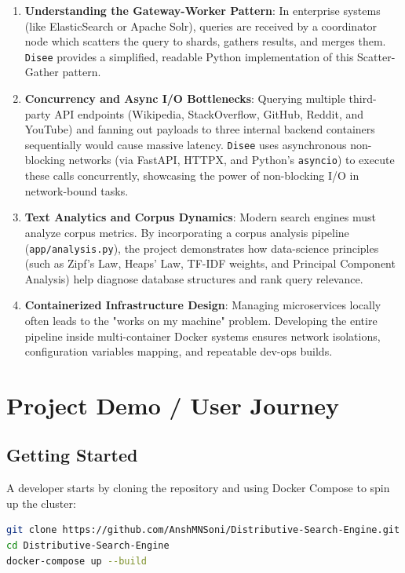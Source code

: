 \documentclass[11pt,a4paper]{article}
\begin{document}
\begin{enumerate}
    \item \textbf{Understanding the Gateway-Worker Pattern}:
    In enterprise systems (like ElasticSearch or Apache Solr), queries are received by a coordinator node which scatters the query to shards, gathers results, and merges them. \texttt{Disee} provides a simplified, readable Python implementation of this Scatter-Gather pattern.
    
    \item \textbf{Concurrency and Async I/O Bottlenecks}:
    Querying multiple third-party API endpoints (Wikipedia, StackOverflow, GitHub, Reddit, and YouTube) and fanning out payloads to three internal backend containers sequentially would cause massive latency. \texttt{Disee} uses asynchronous non-blocking networks (via FastAPI, HTTPX, and Python's \texttt{asyncio}) to execute these calls concurrently, showcasing the power of non-blocking I/O in network-bound tasks.
    
    \item \textbf{Text Analytics and Corpus Dynamics}:
    Modern search engines must analyze corpus metrics. By incorporating a corpus analysis pipeline (\texttt{app/analysis.py}), the project demonstrates how data-science principles (such as Zipf's Law, Heaps' Law, TF-IDF weights, and Principal Component Analysis) help diagnose database structures and rank query relevance.
    
    \item \textbf{Containerized Infrastructure Design}:
    Managing microservices locally often leads to the "works on my machine" problem. Developing the entire pipeline inside multi-container Docker systems ensures network isolations, configuration variables mapping, and repeatable dev-ops builds.
\end{enumerate}

\newpage

\section{Project Demo / User Journey}

\subsection{Getting Started}
A developer starts by cloning the repository and using Docker Compose to spin up the cluster:
\begin{lstlisting}[language=bash]
git clone https://github.com/AnshMNSoni/Distributive-Search-Engine.git
cd Distributive-Search-Engine
docker-compose up --build
\end{lstlisting}
\end{document}
